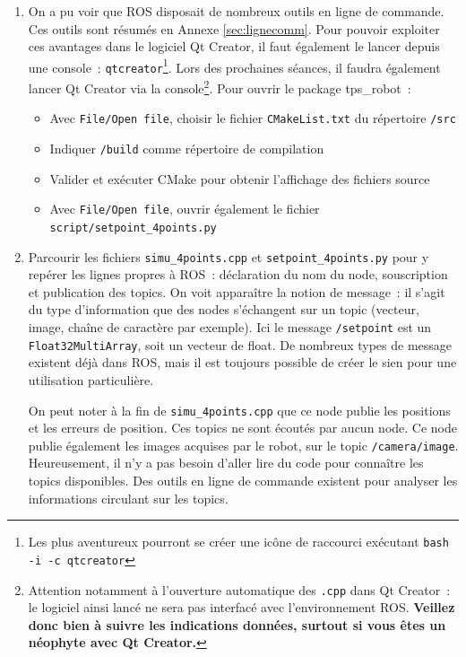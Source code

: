 \documentclass[12pt,a4paper]{article}
\begin{document}
\begin{enumerate}
\item On a pu voir que ROS disposait de nombreux outils en ligne de commande. Ces outils sont résumés en Annexe \ref{sec:lignecomm}.
Pour pouvoir exploiter ces avantages dans le logiciel Qt Creator, il faut également le lancer depuis une console~: \texttt{qtcreator}\footnote{Les plus aventureux pourront se créer une icône de raccourci exécutant \texttt{bash -i -c qtcreator}}.  Lors des prochaines séances, il faudra également lancer Qt Creator via la console\footnote{Attention notamment à l'ouverture automatique des \texttt{.cpp} dans Qt Creator~: le logiciel ainsi lancé ne sera pas interfacé avec l'environnement ROS. \textbf{Veillez donc bien à suivre les indications données, surtout si vous êtes un néophyte avec Qt Creator.}}.
Pour ouvrir le package tps\_robot~:
\begin{itemize}
\item Avec \texttt{File/Open file}, choisir le fichier \texttt{CMakeList.txt} du répertoire \texttt{\ros/src}
\item Indiquer \texttt{\ros/build} comme répertoire de compilation
\item Valider et exécuter CMake pour obtenir l'affichage des fichiers source
\item Avec \texttt{File/Open file}, ouvrir également le fichier \texttt{script/setpoint\_4points.py}
\end{itemize}
\item Parcourir les fichiers \texttt{simu\_4points.cpp} et \texttt{setpoint\_4points.py} pour y repérer les lignes propres à ROS~: déclaration du nom du node, souscription et publication des topics. On voit apparaître la notion de message~: il s'agit du type d'information que des nodes s'échangent sur un topic (vecteur, image, chaîne de caractère par exemple). Ici le message \texttt{/setpoint} est un \texttt{Float32MultiArray}, soit un vecteur de float. De nombreux types de message existent déjà dans ROS, mais il est toujours possible de créer le sien pour une utilisation particulière.

On peut noter à la fin de \texttt{simu\_4points.cpp} que ce node publie les positions et les erreurs de position. Ces topics ne sont écoutés par aucun node.  Ce node publie également les images acquises par le robot, sur le topic \texttt{/camera/image}.  Heureusement, il n'y a pas besoin d'aller lire du code pour connaître les topics disponibles. Des outils en ligne de commande existent pour analyser les informations circulant sur les topics.
\end{enumerate}
\end{document}
